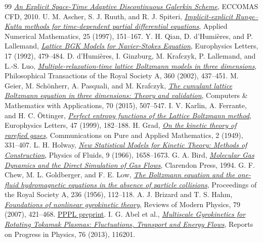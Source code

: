 \begin{thebibliography}{99}
\href{https://congress2.cimne.com/eccomas/proceedings/cfd2010/papers/01008.pdf}{\emph{An Explicit Space-Time Adaptive Discontinuous Galerkin Scheme}},
ECCOMAS CFD, 2010.
U. M. Ascher, S. J. Ruuth, and R. J. Spiteri,
\href{https://doi.org/10.1016/S0168-9274(97)00056-1}{\emph{Implicit-explicit Runge--Kutta methods for time-dependent partial differential equations}},
Applied Numerical Mathematics, 25 (1997), 151--167.
Y. H. Qian, D. d'Humi\`eres, and P. Lallemand,
\href{https://doi.org/10.1209/0295-5075/17/6/001}{\emph{Lattice BGK Models for Navier-Stokes Equation}},
Europhysics Letters, 17 (1992), 479--484.
D. d'Humi\`eres, I. Ginzburg, M. Krafczyk, P. Lallemand, and L.-S. Luo,
\href{https://doi.org/10.1098/rsta.2001.0955}{\emph{Multiple-relaxation-time lattice Boltzmann models in three dimensions}},
Philosophical Transactions of the Royal Society A, 360 (2002), 437--451.
M. Geier, M. Sch\"onherr, A. Pasquali, and M. Krafczyk,
\href{https://doi.org/10.1016/j.camwa.2015.05.001}{\emph{The cumulant lattice Boltzmann equation in three dimensions: Theory and validation}},
Computers \& Mathematics with Applications, 70 (2015), 507--547.
I. V. Karlin, A. Ferrante, and H. C. \"Ottinger,
\href{https://doi.org/10.1209/epl/i1999-00370-1}{\emph{Perfect entropy functions of the Lattice Boltzmann method}},
Europhysics Letters, 47 (1999), 182--188.
H. Grad,
\href{https://doi.org/10.1002/cpa.3160020403}{\emph{On the kinetic theory of rarefied gases}},
Communications on Pure and Applied Mathematics, 2 (1949), 331--407.
L. H. Holway,
\href{https://doi.org/10.1063/1.1761920}{\emph{New Statistical Models for Kinetic Theory: Methods of Construction}},
Physics of Fluids, 9 (1966), 1658--1673.
G. A. Bird,
\href{https://doi.org/10.1093/oso/9780198561958.001.0001}{\emph{Molecular Gas Dynamics and the Direct Simulation of Gas Flows}},
Clarendon Press, 1994.
G. F. Chew, M. L. Goldberger, and F. E. Low,
\href{https://static.ias.edu/pitp/2016/sites/pitp/files/chew_goldberger_low_1956-1.pdf}{\emph{The Boltzmann equation and the one-fluid hydromagnetic equations in the absence of particle collisions}},
Proceedings of the Royal Society A, 236 (1956), 112--118.
A. J. Brizard and T. S. Hahm,
\href{https://doi.org/10.1103/RevModPhys.79.421}{\emph{Foundations of nonlinear gyrokinetic theory}},
Reviews of Modern Physics, 79 (2007), 421--468.
\href{https://bp-pub.pppl.gov/pub_report/2006/PPPL-4153.pdf}{PPPL preprint}.
I. G. Abel et al.,
\href{https://arxiv.org/abs/1209.4782}{\emph{Multiscale Gyrokinetics for Rotating Tokamak Plasmas: Fluctuations, Transport and Energy Flows}},
Reports on Progress in Physics, 76 (2013), 116201.
\end{thebibliography}
